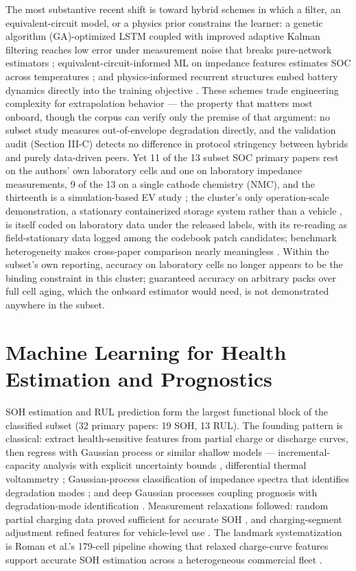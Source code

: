 \documentclass[journal]{IEEEtran}
\begin{document}
The most substantive recent shift is toward hybrid schemes in which a filter, an equivalent-circuit model, or a physics prior constrains the learner: a genetic algorithm (GA)-optimized LSTM coupled with improved adaptive Kalman filtering reaches low error under measurement noise that breaks pure-network estimators \cite{r42}; equivalent-circuit-informed ML on impedance features estimates SOC across temperatures \cite{r43}; and physics-informed recurrent structures embed battery dynamics directly into the training objective \cite{r10}. These schemes trade engineering complexity for extrapolation behavior --- the property that matters most onboard, though the corpus can verify only the premise of that argument: no subset study measures out-of-envelope degradation directly, and the validation audit (Section III-C) detects no difference in protocol stringency between hybrids and purely data-driven peers. Yet 11 of the 13 subset SOC primary papers rest on the authors' own laboratory cells and one on laboratory impedance measurements, 9 of the 13 on a single cathode chemistry (NMC), and the thirteenth is a simulation-based EV study \cite{r35}; the cluster's only operation-scale demonstration, a stationary containerized storage system rather than a vehicle \cite{r39}, is itself coded on laboratory data under the released labels, with its re-reading as field-stationary data logged among the codebook patch candidates; benchmark heterogeneity makes cross-paper comparison nearly meaningless \cite{r1}\cite{r18}. Within the subset's own reporting, accuracy on laboratory cells no longer appears to be the binding constraint in this cluster; guaranteed accuracy on arbitrary packs over full cell aging, which the onboard estimator would need, is not demonstrated anywhere in the subset.

\section{Machine Learning for Health Estimation and Prognostics}

SOH estimation and RUL prediction form the largest functional block of the classified subset (32 primary papers: 19 SOH, 13 RUL). The founding pattern is classical: extract health-sensitive features from partial charge or discharge curves, then regress with Gaussian process or similar shallow models --- incremental-capacity analysis with explicit uncertainty bounds \cite{r44}, differential thermal voltammetry \cite{r45}; Gaussian-process classification of impedance spectra that identifies degradation modes \cite{r46}; and deep Gaussian processes coupling prognosis with degradation-mode identification \cite{r47}. Measurement relaxations followed: random partial charging data proved sufficient for accurate SOH \cite{r48}, and charging-segment adjustment refined features for vehicle-level use \cite{r49}. The landmark systematization is Roman et al.'s 179-cell pipeline showing that relaxed charge-curve features support accurate SOH estimation across a heterogeneous commercial fleet \cite{r50}.
\end{document}
